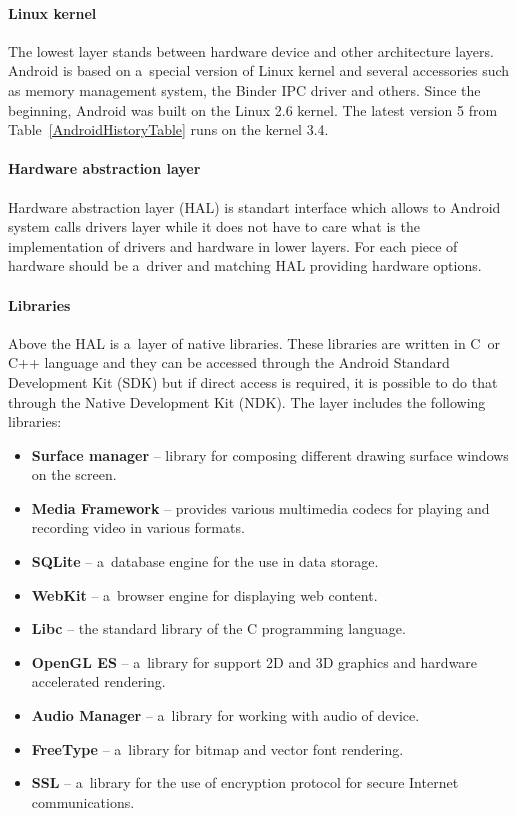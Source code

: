 \paragraph{Linux kernel}
The lowest layer stands between hardware device and other architecture layers. Android is based on a~special version of
Linux kernel and several accessories such as memory management system, the Binder IPC driver and others. Since the
beginning, Android was built on the Linux 2.6 kernel. The latest version 5 from Table~\ref{AndroidHistoryTable} runs on
the kernel 3.4.

\paragraph{Hardware abstraction layer}
Hardware abstraction layer (HAL) is standart interface which allows to Android system calls drivers layer while it does
not have to care what is the implementation of drivers and hardware in lower layers. For each piece of hardware should
be a~driver and matching HAL providing hardware options.

\paragraph{Libraries}
Above the HAL is a~layer of native libraries. These libraries are written in C~or C++ language and they can be accessed
through the Android Standard Development Kit (SDK) but if direct access is required, it is possible to do that through
the Native Development Kit (NDK). The layer includes the following libraries:

\begin{itemize}
    \item \textbf{Surface manager} -- library for composing different drawing surface windows on the screen.
    \item \textbf{Media Framework} -- provides various multimedia codecs for playing and recording video in various
    formats.
    \item \textbf{SQLite} -- a~database engine for the use in data storage.
    \item \textbf{WebKit} -- a~browser engine for displaying web content.
    \item \textbf{Libc} -- the standard library of the C programming language.
    \item \textbf{OpenGL ES} -- a~library for support 2D and 3D graphics and hardware accelerated rendering.
    \item \textbf{Audio Manager} -- a~library for working with audio of device.
    \item \textbf{FreeType} -- a~library for bitmap and vector font rendering.
    \item \textbf{SSL} -- a~library for the use of encryption protocol for secure Internet communications.
\end{itemize}

